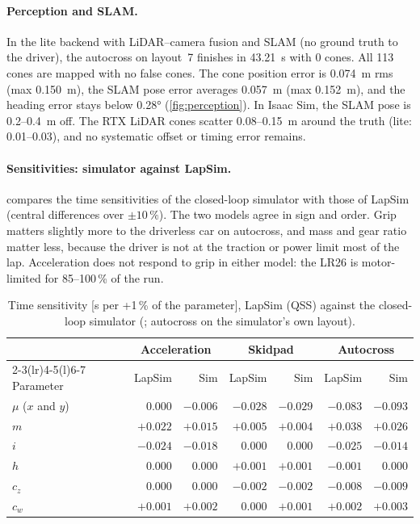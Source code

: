 \documentclass[11pt]{article}
\begin{document}
\paragraph{Perception and SLAM.} In the lite backend with LiDAR--camera fusion and SLAM (no ground truth to the
driver), the autocross on layout~7 finishes in \SI{43.21}{s} with 0 cones. All 113 cones are mapped with no false
cones. The cone position error is \SI{0.074}{m} rms (max \SI{0.150}{m}), the SLAM pose error averages \SI{0.057}{m}
(max \SI{0.152}{m}), and the heading error stays below \ang{0.28} (\cref{fig:perception}). In Isaac Sim, the SLAM
pose is 0.2--\SI{0.4}{m} off. The RTX LiDAR cones scatter 0.08--\SI{0.15}{m} around the truth (lite: 0.01--0.03),
and no systematic offset or timing error remains.

\paragraph{Sensitivities: simulator against LapSim.}  compares the time sensitivities of the
closed-loop simulator with those of LapSim (central differences over $\pm10\,\%$). The two models agree in sign
and order. Grip matters slightly more to the driverless car on autocross, and mass and gear ratio matter less,
because the driver is not at the traction or power limit most of the lap. Acceleration does not respond to grip in
either model: the LR26 is motor-limited for 85--100\,\% of the run.

\begin{table}[t]
\centering\small
\caption{Time sensitivity [s per +1\,\% of the parameter], LapSim (QSS) against the closed-loop simulator
(; autocross on the simulator's own layout).}
\label{tab:sens}
\begin{tabular}{@{}lrrrrrr@{}}
\toprule
& \multicolumn{2}{c}{Acceleration} & \multicolumn{2}{c}{Skidpad} & \multicolumn{2}{c}{Autocross}\\
\cmidrule(lr){2-3}\cmidrule(lr){4-5}\cmidrule(l){6-7}
Parameter & LapSim & Sim & LapSim & Sim & LapSim & Sim\\
\midrule
$\mu$ ($x$ and $y$) & 0.000 & $-0.006$ & $-0.028$ & $-0.029$ & $-0.083$ & $-0.093$\\
$m$ & $+0.022$ & $+0.015$ & $+0.005$ & $+0.004$ & $+0.038$ & $+0.026$\\
$i$ & $-0.024$ & $-0.018$ & 0.000 & 0.000 & $-0.025$ & $-0.014$\\
$h$ & 0.000 & 0.000 & $+0.001$ & $+0.001$ & $-0.001$ & 0.000\\
$c_z$ & 0.000 & 0.000 & $-0.002$ & $-0.002$ & $-0.008$ & $-0.009$\\
$c_w$ & $+0.001$ & $+0.002$ & 0.000 & $+0.001$ & $+0.002$ & $+0.003$\\
\bottomrule
\end{tabular}
\end{table}
\end{document}
